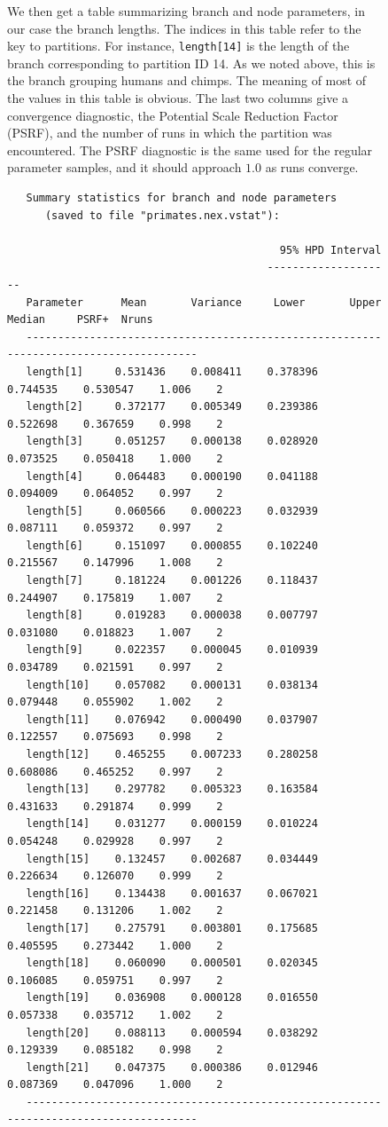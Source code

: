 \documentclass[12pt]{book}
\newcommand{\ttt}[1]{\texttt{#1}}
\begin{document}
\begin{figure}[h]
We then get a table summarizing branch and node parameters, in our case the branch lengths. The
indices in this table refer to the key to partitions. For instance, \ttt{length[14]} is the length
of the branch corresponding to partition ID 14. As we noted above, this is the branch grouping
humans and chimps. The meaning of most of the values in this table is obvious. The last two columns
give a convergence diagnostic, the Potential Scale Reduction Factor (PSRF), and the number of runs
in which the partition was encountered. The PSRF diagnostic is the same used for the regular
parameter samples, and it should approach $1.0$ as runs converge.

\begin{singlespacing}
\scriptsize
\begin{verbatim}
   Summary statistics for branch and node parameters
      (saved to file "primates.nex.vstat"):

                                           95% HPD Interval
                                         --------------------
   Parameter      Mean       Variance     Lower       Upper       Median     PSRF+  Nruns
   --------------------------------------------------------------------------------------
   length[1]     0.531436    0.008411    0.378396    0.744535    0.530547    1.006    2
   length[2]     0.372177    0.005349    0.239386    0.522698    0.367659    0.998    2
   length[3]     0.051257    0.000138    0.028920    0.073525    0.050418    1.000    2
   length[4]     0.064483    0.000190    0.041188    0.094009    0.064052    0.997    2
   length[5]     0.060566    0.000223    0.032939    0.087111    0.059372    0.997    2
   length[6]     0.151097    0.000855    0.102240    0.215567    0.147996    1.008    2
   length[7]     0.181224    0.001226    0.118437    0.244907    0.175819    1.007    2
   length[8]     0.019283    0.000038    0.007797    0.031080    0.018823    1.007    2
   length[9]     0.022357    0.000045    0.010939    0.034789    0.021591    0.997    2
   length[10]    0.057082    0.000131    0.038134    0.079448    0.055902    1.002    2
   length[11]    0.076942    0.000490    0.037907    0.122557    0.075693    0.998    2
   length[12]    0.465255    0.007233    0.280258    0.608086    0.465252    0.997    2
   length[13]    0.297782    0.005323    0.163584    0.431633    0.291874    0.999    2
   length[14]    0.031277    0.000159    0.010224    0.054248    0.029928    0.997    2
   length[15]    0.132457    0.002687    0.034449    0.226634    0.126070    0.999    2
   length[16]    0.134438    0.001637    0.067021    0.221458    0.131206    1.002    2
   length[17]    0.275791    0.003801    0.175685    0.405595    0.273442    1.000    2
   length[18]    0.060090    0.000501    0.020345    0.106085    0.059751    0.997    2
   length[19]    0.036908    0.000128    0.016550    0.057338    0.035712    1.002    2
   length[20]    0.088113    0.000594    0.038292    0.129339    0.085182    0.998    2
   length[21]    0.047375    0.000386    0.012946    0.087369    0.047096    1.000    2
   --------------------------------------------------------------------------------------
\end{verbatim}
\normalsize
\end{singlespacing}


\end{figure}
\end{document}
